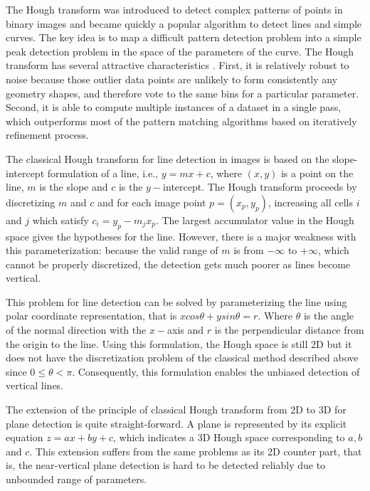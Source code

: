 \label{apdx:HSPD}

The Hough transform was introduced to detect complex patterns 
of points in binary images and became quickly a popular algorithm 
to detect lines and simple curves.
The key idea is to map a difficult pattern detection problem into a simple
peak detection problem in the space of the parameters of the curve.
The Hough transform has several attractive characteristics \cite{book_tv}.
First, it is relatively robust to noise because 
those outlier data points are unlikely to form consistently any geometry shapes, 
and therefore vote to the same bins for a particular parameter.
Second, it is able to compute multiple instances of a dataset in a single pass,
which outperforms most of the pattern matching algorithms based on iteratively
refinement process.

The classical Hough transform \cite{Hough} for line detection in images is based on 
the slope-intercept formulation of a line, i.e., $y = mx + c$, where $(x, y)$ 
is a point on the line, $m$ is the slope and $c$ is the $y-$intercept. 
The Hough transform proceeds by discretizing $m$ and $c$ and for each image point
$p = (x_p, y_p)$, increasing all cells $i$ and $j$ which satisfy $c_i = y_p - m_jx_p$.
The largest accumulator value in the Hough space gives the hypotheses for the line.
However, there is a major weakness with this parameterization: 
because the valid range of $m$ is from $-\infty$ to $+\infty$, 
which cannot be properly discretized, 
the detection gets much poorer as lines become vertical. 

This problem for line detection can be solved by parameterizing the line 
using polar coordinate representation, that is
$xcos\theta + ysin\theta = r$. 
Where $\theta$ is the angle of the normal direction with the $x-$axis 
and $r$ is the perpendicular distance from the origin to the line.
Using this formulation, the Hough space is still 2D but it does not have the discretization
problem of the classical method described above since $0 \le \theta < \pi$.
Consequently, this formulation enables the unbiased detection of vertical lines.

The extension of the principle of classical Hough transform from 2D to 3D for 
plane detection is quite straight-forward. 
A plane is represented by its explicit equation $z = ax + by + c$,
which indicates a 3D Hough space corresponding to $a, b$ and $c$.
This extension suffers from the same problems as its 2D counter part, that is, 
the near-vertical plane detection is hard to be detected reliably due to 
unbounded range of parameters.

